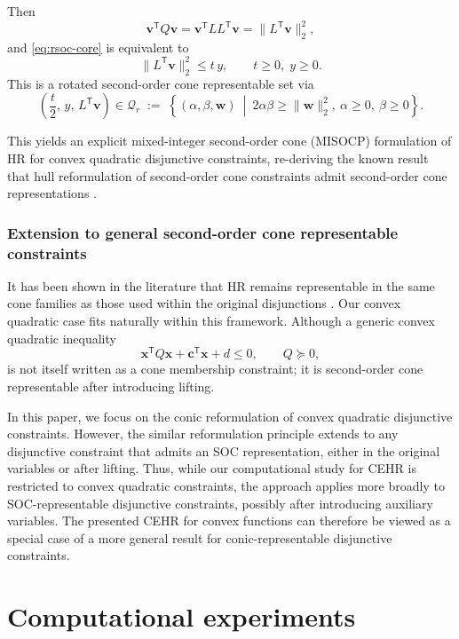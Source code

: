 \documentclass[11pt]{article}
\begin{document}
Then
\[
    \mathbf v^{\mathsf T}Q\mathbf v
    = \mathbf v^{\mathsf T} L L^{\mathsf T}\mathbf v
    = \|L^{\mathsf T}\mathbf v\|_2^2,
\]
and \eqref{eq:rsoc-core} is equivalent to
\[
    \|L^{\mathsf T}\mathbf v\|_2^2 \le t\,y,
    \qquad t\ge 0,\; y\ge 0.
\]
This is a rotated second-order cone representable set via
\[
    \left(\frac{t}{2},\, y,\, L^{\mathsf T}\mathbf v\right)\in\mathcal Q_r
    \;:=\;\left\{(\alpha,\beta,\mathbf w)\ \middle|\ 2\alpha\beta \ge \|\mathbf w\|_2^2,\ \alpha\ge 0,\ \beta\ge 0\right\}.
\]

This yields an explicit mixed-integer second-order cone (MISOCP) formulation of HR for convex quadratic disjunctive constraints, re-deriving the known result that hull reformulation of second-order cone constraints admit second-order cone representations \cite{bernalneiraConvexMixedintegerNonlinear2024}.


\subsubsection{Extension to general second-order cone representable constraints}
\label{sec:conic-extension-soc}

It has been shown in the literature that HR remains representable in the same cone families as those used within the original disjunctions \cite{bernalneiraConvexMixedintegerNonlinear2024}.
Our convex quadratic case fits naturally within this framework.
Although a generic convex quadratic inequality
\[
\mathbf x^{\mathsf T}Q\mathbf x+\mathbf c^{\mathsf T}\mathbf x+d\le 0,
\qquad Q\succeq 0,
\]
is not itself written as a cone membership constraint; it is second-order cone representable after introducing lifting.


In this paper, we focus on the conic reformulation of convex quadratic disjunctive constraints.
However, the similar reformulation principle extends to any disjunctive constraint that admits an SOC representation, either in the original variables or after lifting.
Thus, while our computational study for CEHR is restricted to convex quadratic constraints, the approach applies more broadly to SOC-representable disjunctive constraints, possibly after introducing auxiliary variables. 
The presented CEHR for convex functions can therefore be viewed as a special case of a more general result for conic-representable disjunctive constraints.


\section{Computational experiments}
\label{sec:experiments}
\end{document}
